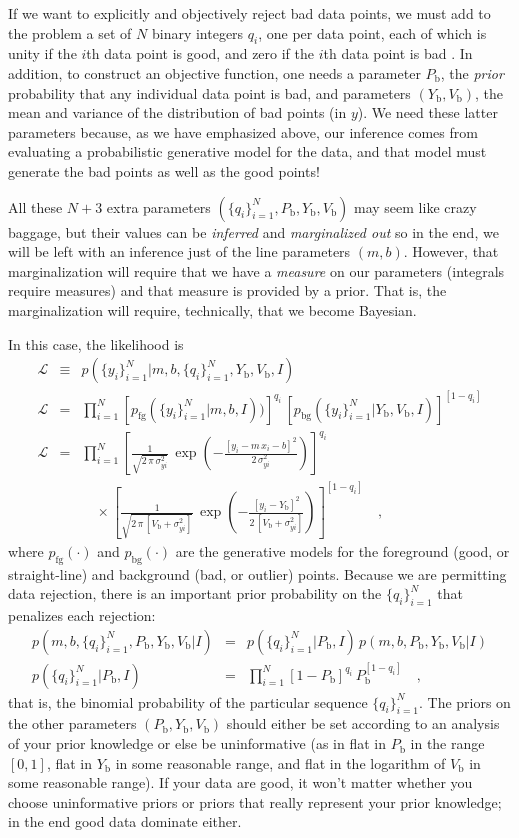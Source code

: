 \documentclass[12pt,twoside]{article}
\newcounter{problem}
\newcommand{\setofall}[3]{\{{#1}\}_{{#2}}^{{#3}}}
\newcommand{\allq}{\setofall{q_i}{i=1}{N}}
\newcommand{\ally}{\setofall{y_i}{i=1}{N}}
\newcommand{\like}{\mathscr{L}}
\newcommand{\pfg}{p_{\mathrm{fg}}}
\newcommand{\pbg}{p_{\mathrm{bg}}}
\newcommand{\Pbad}{P_{\mathrm{b}}}
\newcommand{\Ybad}{Y_{\mathrm{b}}}
\newcommand{\Vbad}{V_{\mathrm{b}}}
\begin{document}
If we want to explicitly and objectively reject bad data points, we
must add to the problem a set of $N$ binary integers $q_i$, one per
data point, each of which is unity if the $i$th data point is good,
and zero if the $i$th data point is bad \citep{pressH0,jaynes}.  In
addition, to construct an objective function, one needs a parameter
$\Pbad$, the \emph{prior} probability that any individual data point
is bad, and parameters $(\Ybad,\Vbad)$, the mean and variance of the
distribution of bad points (in $y$).  We need these latter parameters
because, as we have emphasized above, our inference comes from
evaluating a probabilistic generative model for the data, and that
model must generate the bad points as well as the good points!

All these $N+3$ extra parameters $(\allq,\Pbad,\Ybad,\Vbad)$ may seem
like crazy baggage, but their values can be \emph{inferred} and
\emph{marginalized out} so in the end, we will be left with an
inference just of the line parameters $(m,b)$.  However, that
marginalization will require that we have a \emph{measure} on our
parameters (integrals require measures) and that measure is provided
by a prior.  That is, the marginalization will require, technically,
that we become Bayesian.

In this case, the likelihood is
\begin{eqnarray}\displaystyle
\like &\equiv& p(\ally|m,b,\allq,\Ybad,\Vbad,I)
 \nonumber\\
\like &=& \prod_{i=1}^N
 \left[\pfg(\ally|m,b,I))\right]^{q_i}\,
 \left[\pbg(\ally|\Ybad,\Vbad,I)\right]^{[1-q_i]}
 \nonumber\\
\like &=& \prod_{i=1}^N \left[\frac{1}{\sqrt{2\,\pi\,\sigma_{yi}^2}}
 \,\exp\left(-\frac{[y_i-m\,x_i-b]^2}{2\,\sigma_{yi}^2}\right)\right]^{q_i}
 \nonumber \\ & & \quad\times
 \left[\frac{1}{\sqrt{2\,\pi\,[\Vbad+\sigma_{yi}^2]}}
 \,\exp\left(-\frac{[y_i-\Ybad]^2}{2\,[\Vbad+\sigma_{yi}^2]}\right)\right]^{[1-q_i]}
 \quad ,
\end{eqnarray}
where $\pfg(\cdot)$ and $\pbg(\cdot)$ are the generative models for
the foreground (good, or straight-line) and background (bad, or
outlier) points.  Because we are permitting data rejection, there is
an important prior probability on the $\allq$ that penalizes each
rejection:
\begin{eqnarray}\displaystyle
p(m,b,\allq,\Pbad,\Ybad,\Vbad|I)
 &=& p(\allq|\Pbad,I)\,p(m,b,\Pbad,\Ybad,\Vbad|I)
 \nonumber\\
p(\allq|\Pbad,I)
 &=& \prod_{i=1}^N[1-\Pbad]^{q_i}\,\Pbad^{[1-q_i]}
 \quad ,
\end{eqnarray}
that is, the binomial probability of the particular sequence $\allq$.
The priors on the other parameters $(\Pbad,\Ybad,\Vbad)$ should either
be set according to an analysis of your prior knowledge or else be
uninformative (as in flat in $\Pbad$ in the range $[0,1]$, flat in
$\Ybad$ in some reasonable range, and flat in the logarithm of $\Vbad$
in some reasonable range).  If your data are good, it won't matter
whether you choose uninformative priors or priors that really
represent your prior knowledge; in the end good data dominate either.
\end{document}
